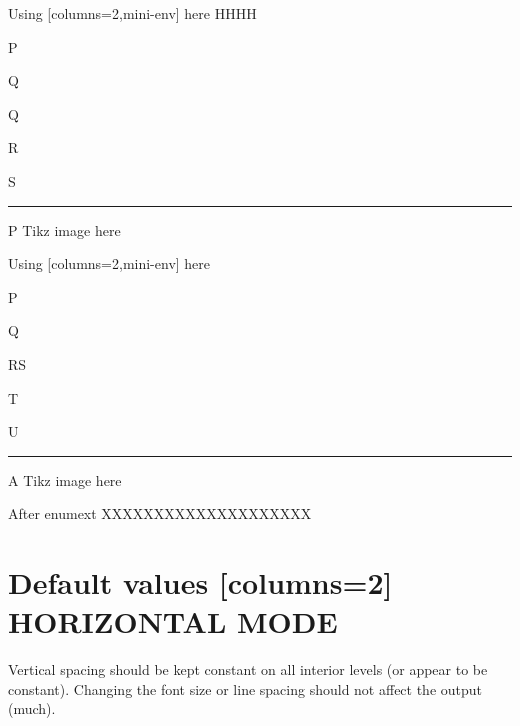 \documentclass[10pt]{article}
\begin{document}
\begin{enumext}[columns=2,below={8pt}]
\item Using [columns=2,mini-env] here HHHH

  \begin{enumext}[columns=1,mini-env=0.4\linewidth]%
     \item  P \item Q \item Q  \item R \item S
    \miniright
    \rule{30pt}{20pt}\par
    P Tikz image here
  \end{enumext}

\item Using [columns=2,mini-env] here

  \begin{enumext}[columns=1,mini-env=0.4\linewidth]%
    \item  P \item Q \item RS \item T \item U
    \miniright
    \rule{30pt}{20pt}\par
    A Tikz image here
  \end{enumext}

\end{enumext}

After enumext XXXXXXXXXXXXXXXXXXXX

\newpage


\section{Default values [columns=2] HORIZONTAL MODE}

Vertical spacing should be kept constant on all interior levels (or
appear to be constant). Changing the font size or line spacing should
not affect the output (much).
\end{document}
